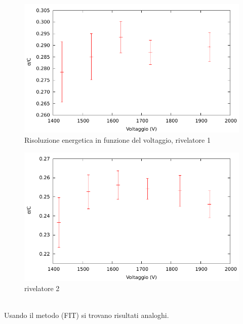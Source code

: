 \documentclass[a4paper,11pt,italian]{report}
\begin{document}
\begin{minipage}{\linewidth}
\begin{minipage}{0.45\linewidth}
\centering
\begin{figure}[H]
\includegraphics[width=\columnwidth,keepaspectratio]{../out/chio/Guadagno_R1}
\caption{\small{Risoluzione energetica in funzione del voltaggio, rivelatore 1}}
\end{figure}
\end{minipage}
\hspace{\fill}
\begin{minipage}{0.45\linewidth}
\centering
\begin{figure}[H]
\includegraphics[width=\columnwidth,keepaspectratio]{../out/chio/Guadagno_R2}
\caption{\small{rivelatore 2}}
\end{figure}
\end{minipage}
\end{minipage}

~\\
Usando il metodo (FIT) si trovano risultati analoghi.
\end{document}
